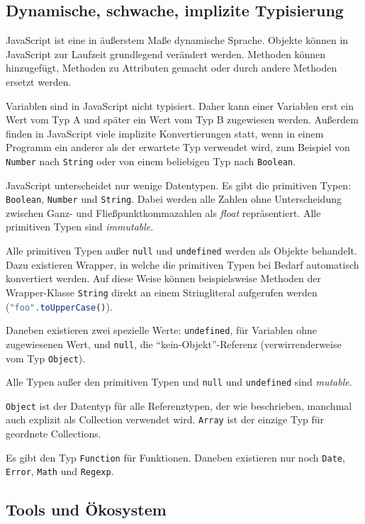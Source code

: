 \documentclass[a4paper, 12pt, listof=totoc, bibliography=totoc]{scrreprt}
\begin{document}
\subsection{Dynamische, schwache, implizite Typisierung}

JavaScript ist eine in äußerstem Maße dynamische Sprache. Objekte können in JavaScript zur Laufzeit grundlegend verändert werden. Methoden können hinzugefügt, Methoden zu Attributen gemacht oder durch andere Methoden ersetzt werden.

Variablen sind in JavaScript nicht typisiert. Daher kann einer Variablen erst ein Wert vom Typ A und später ein Wert vom Typ B zugewiesen werden. Außerdem finden in JavaScript viele implizite Konvertierungen statt, wenn in einem Programm ein anderer als der erwartete Typ verwendet wird, zum Beispiel von \texttt{Number} nach \texttt{String} oder von einem beliebigen Typ nach \texttt{Boolean}.

JavaScript unterscheidet nur wenige Datentypen. Es gibt die primitiven Typen: \texttt{Boolean}, \texttt{Number} und \texttt{String}. 
Dabei werden alle Zahlen ohne Unterscheidung zwischen Ganz- und Fließpunktkommazahlen als \textit{float} repräsentiert. Alle primitiven Typen sind \textit{immutable}.

Alle primitiven Typen außer \texttt{null} und \texttt{undefined} werden als Objekte behandelt. Dazu existieren Wrapper, in welche die primitiven Typen bei Bedarf automatisch konvertiert werden. Auf diese Weise können beispielsweise Methoden der Wrapper-Klasse \texttt{String} direkt an einem Stringliteral aufgerufen werden (\lstinline[language=JavaScript, style=inline]|"foo".toUpperCase()|).

Daneben existieren zwei spezielle Werte: \texttt{undefined}, für Variablen ohne zugewiesenen Wert, und \texttt{null}, die "`kein-Objekt"'-Referenz (verwirrenderweise vom Typ \texttt{Object}).

Alle Typen außer den primitiven Typen und \texttt{null} und \texttt{undefined} sind \textit{mutable}.

\texttt{Object} ist der Datentyp für alle Referenztypen, der wie beschrieben, manchmal auch explizit als Collection verwendet wird. \texttt{Array} ist der einzige Typ für geordnete Collections.

Es gibt den Typ \texttt{Function} für Funktionen. Daneben existieren nur noch \texttt{Date}, \texttt{Error}, \texttt{Math} und \texttt{Regexp}.
\cite[S. 29 ff.]{flanagan2011.JDG}

\subsection{Tools und Ökosystem}
\end{document}

